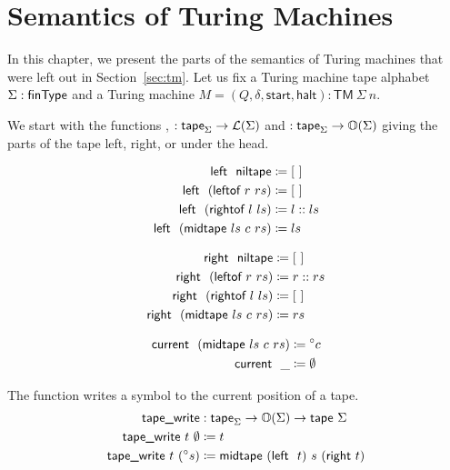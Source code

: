\chapter{Semantics of Turing Machines}\label{app:TM} 

In this chapter, we present the parts of the semantics of Turing machines that were left out in Section~\ref{sec:tm}. Let us fix a Turing machine tape alphabet $\Sigma :\textsf{finType}$ and a Turing machine $M = (Q, \delta, \textsf{start}, \textsf{halt}) : \textsf{TM}~\Sigma~n$.

%
We start with the functions ,  $: \textsf{tape}_\Sigma \rightarrow \mathcal{L} (\Sigma)$ and  $: \textsf{tape}_\Sigma \rightarrow \mathbb{O}{(\Sigma)}$ giving the parts of the tape left, right, or under the head.

\begin{minipage}{0.5\textwidth}
\begin{align*}
  \textsf{left}~~\textsf{niltape} &\coloneqq [~] \\
  \textsf{left}~~(\textsf{leftof}~r~rs) &\coloneqq [~] \\
  \textsf{left}~~(\textsf{rightof}~l~ls) &\coloneqq l :: ls \\
  \textsf{left}~~(\textsf{midtape}~ls~c~rs) &\coloneqq ls 
\end{align*}
\end{minipage}
\begin{minipage}{0.5\textwidth}
  \begin{align*}
    \textsf{right}~~\textsf{niltape} &\coloneqq [~] \\
    \textsf{right}~~(\textsf{leftof}~r~rs) & \coloneqq r :: rs \\
    \textsf{right}~~(\textsf{rightof}~l~ls) &\coloneqq [~] \\
    \textsf{right}~~(\textsf{midtape}~ls~c~rs) &\coloneqq rs
  \end{align*}
\end{minipage}
\begin{align*}
  \textsf{current}~~(\textsf{midtape}~ls~c~rs) &\coloneqq \prescript{\circ}{}c \\
  \textsf{current}~~\_ &\coloneqq \emptyset 
\end{align*}

The function  writes a symbol to the current position of a tape.
\begin{align*}
  \textsf{tape\_write} &: \textsf{tape}_\Sigma \rightarrow \mathbb{O}{(\Sigma)} \rightarrow \textsf{tape}~\Sigma \\
  \textsf{tape\_write}~t~\emptyset &\coloneqq t \\
  \textsf{tape\_write}~t~(\prescript{\circ}{}s) &\coloneqq \textsf{midtape}~(\textsf{left}~~t)~s~(\textsf{right}~t)
\end{align*}

